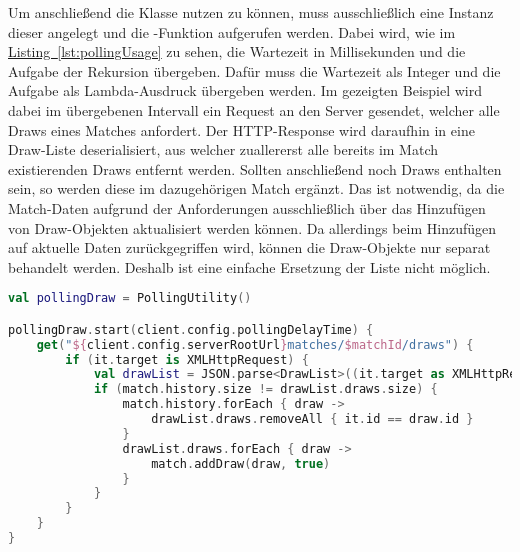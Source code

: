 Um anschließend die Klasse  nutzen zu können, muss ausschließlich eine Instanz dieser angelegt und die -Funktion aufgerufen werden. Dabei wird, wie im \hyperref[lst:pollingUsage]{Listing~\ref{lst:pollingUsage}} zu sehen, die Wartezeit in Millisekunden und die Aufgabe der Rekursion übergeben. Dafür muss die Wartezeit als Integer und die Aufgabe als Lambda-Ausdruck übergeben werden. Im gezeigten Beispiel wird dabei im übergebenen Intervall ein Request an den Server gesendet, welcher alle Draws eines Matches anfordert. Der \gls{HTTP}-Response wird daraufhin in eine Draw-Liste deserialisiert, aus welcher zuallererst alle bereits im Match existierenden Draws entfernt werden. Sollten anschließend noch Draws enthalten sein, so werden diese im dazugehörigen Match ergänzt. Das ist notwendig, da die Match-Daten aufgrund der Anforderungen ausschließlich über das Hinzufügen von Draw-Objekten aktualisiert werden können. Da allerdings beim Hinzufügen auf aktuelle Daten zurückgegriffen wird, können die Draw-Objekte nur separat behandelt werden. Deshalb ist eine einfache Ersetzung der Liste nicht möglich.\\
\begin{lstlisting}[style=lstStyleFramed, language=Kotlin, caption={Einbindung bzw. Nutzung der \code{PollingUtility} Klasse}, label=lst:pollingUsage, float]
val pollingDraw = PollingUtility()

pollingDraw.start(client.config.pollingDelayTime) {
	get("${client.config.serverRootUrl}matches/$matchId/draws") {
		if (it.target is XMLHttpRequest) {
			val drawList = JSON.parse<DrawList>((it.target as XMLHttpRequest).responseText)
			if (match.history.size != drawList.draws.size) {
				match.history.forEach { draw ->
					drawList.draws.removeAll { it.id == draw.id }
				}
				drawList.draws.forEach { draw ->
					match.addDraw(draw, true)
				}
			}
		}
	}
}
\end{lstlisting}